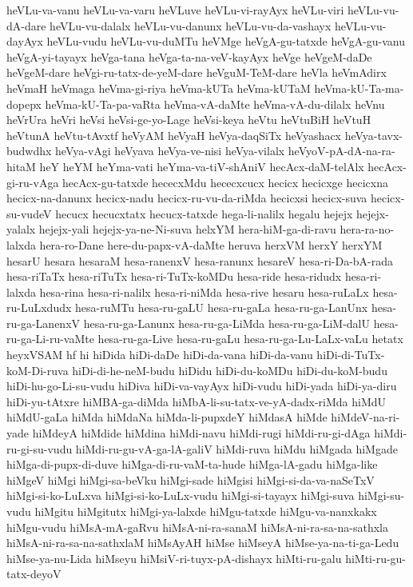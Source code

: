 {heVLu-va-vanu
heVLu-va-varu
heVLuve
heVLu-vi-rayAyx
heVLu-viri
heVLu-vu-dA-dare
heVLu-vu-dalalx
heVLu-vu-danunx
heVLu-vu-da-vashayx
heVLu-vu-dayAyx
heVLu-vudu
heVLu-vu-duMTu
heVMge
heVgA-gu-tatxde
heVgA-gu-vanu
heVgA-yi-tayayx
heVga-tana
heVga-ta-na-veV-kayAyx
heVge
heVgeM-daDe
heVgeM-dare
heVgi-ru-tatx-de-yeM-dare
heVguM-TeM-dare
heVla
heVmAdirx
heVmaH
heVmaga
heVma-gi-riya
heVma-kUTa
heVma-kUTaM
heVma-kU-Ta-ma-dopepx
heVma-kU-Ta-pa-vaRta
heVma-vA-daMte
heVma-vA-du-dilalx
heVnu
heVrUra
heVri
heVsi
heVsi-ge-yo-Lage
heVsi-keya
heVtu
heVtuBiH
heVtuH
heVtunA
heVtu-tAvxtf
heVyAM
heVyaH
heVya-daqSiTx
heVyashacx
heVya-tavx-budwdhx
heVya-vAgi
heVyava
heVya-ve-nisi
heVya-vilalx
heVyoV-pA-dA-na-ra-hitaM
heY
heYM
heYma-vati
heYma-va-tiV-shAniV
hecAcx-daM-telAlx
hecAcx-gi-ru-vAga
hecAcx-gu-tatxde
hececxMdu
hececxcucx
hecicx
hecicxge
hecicxna
hecicx-na-danunx
hecicx-nadu
hecicx-ru-vu-da-riMda
hecicxsi
hecicx-suva
hecicx-su-vudeV
hecucx
hecucxtatx
hecucx-tatxde
hega-li-nalilx
hegalu
hejejx
hejejx-yalalx
hejejx-yali
hejejx-ya-ne-Ni-suva
helxYM
hera-hiM-ga-di-ravu
hera-ra-no-lalxda
hera-ro-Dane
here-du-papx-vA-daMte
heruva
herxVM
herxY
herxYM
hesarU
hesara
hesaraM
hesa-ranenxV
hesa-ranunx
hesareV
hesa-ri-Da-bA-rada
hesa-riTaTx
hesa-riTuTx
hesa-ri-TuTx-koMDu
hesa-ride
hesa-ridudx
hesa-ri-lalxda
hesa-rina
hesa-ri-nalilx
hesa-ri-niMda
hesa-rive
hesaru
hesa-ruLaLx
hesa-ru-LuLxdudx
hesa-ruMTu
hesa-ru-gaLU
hesa-ru-gaLa
hesa-ru-ga-LanUnx
hesa-ru-ga-LanenxV
hesa-ru-ga-Lanunx
hesa-ru-ga-LiMda
hesa-ru-ga-LiM-dalU
hesa-ru-ga-Li-ru-vaMte
hesa-ru-ga-Live
hesa-ru-gaLu
hesa-ru-ga-Lu-LaLx-vaLu
hetatx
heyxVSAM
hf
hi
hiDida
hiDi-daDe
hiDi-da-vana
hiDi-da-vanu
hiDi-di-TuTx-koM-Di-ruva
hiDi-di-he-neM-budu
hiDidu
hiDi-du-koMDu
hiDi-du-koM-budu
hiDi-hu-go-Li-su-vudu
hiDiva
hiDi-va-vayAyx
hiDi-vudu
hiDi-yada
hiDi-ya-diru
hiDi-yu-tAtxre
hiMBA-ga-diMda
hiMbA-li-su-tatx-ve-yA-dadx-riMda
hiMdU
hiMdU-gaLa
hiMda
hiMdaNa
hiMda-li-pupxdeY
hiMdasA
hiMde
hiMdeV-na-ri-yade
hiMdeyA
hiMdide
hiMdina
hiMdi-navu
hiMdi-rugi
hiMdi-ru-gi-dAga
hiMdi-ru-gi-su-vudu
hiMdi-ru-gu-vA-ga-lA-galiV
hiMdi-ruva
hiMdu
hiMgada
hiMgade
hiMga-di-pupx-di-duve
hiMga-di-ru-vaM-ta-hude
hiMga-lA-gadu
hiMga-like
hiMgeV
hiMgi
hiMgi-sa-beVku
hiMgi-sade
hiMgisi
hiMgi-si-da-va-naSeTxV
hiMgi-si-ko-LuLxva
hiMgi-si-ko-LuLx-vudu
hiMgi-si-tayayx
hiMgi-suva
hiMgi-su-vudu
hiMgitu
hiMgitutx
hiMgi-ya-lalxde
hiMgu-tatxde
hiMgu-va-nanxkakx
hiMgu-vudu
hiMsA-mA-gaRvu
hiMsA-ni-ra-sanaM
hiMsA-ni-ra-sa-na-sathxla
hiMsA-ni-ra-sa-na-sathxlaM
hiMsAyAH
hiMse
hiMseyA
hiMse-ya-na-ti-ga-Ledu
hiMse-ya-nu-Lida
hiMseyu
hiMsiV-ri-tuyx-pA-dishayx
hiMti-ru-galu
hiMti-ru-gu-tatx-deyoV
}

